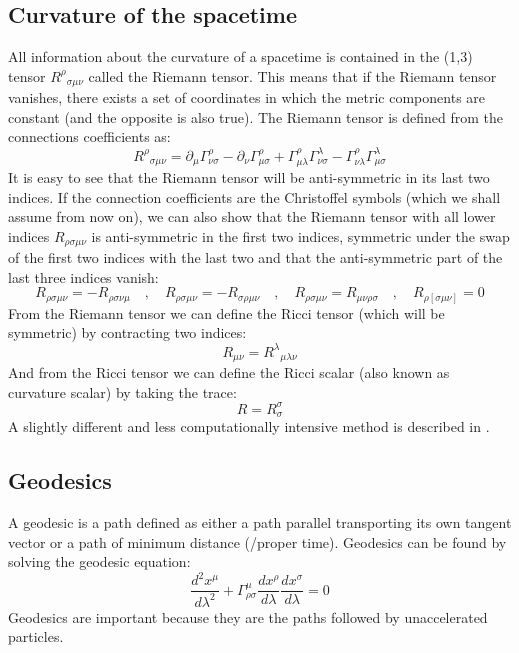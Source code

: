 \subsection{Curvature of the spacetime}
\thispagestyle{empty}
All information about the curvature of a spacetime is contained in the (1,3) tensor ${R^\rho}_{\sigma \mu \nu}$ called the Riemann tensor. This means that if the Riemann tensor vanishes, there exists a set of coordinates in which the metric components are constant (and the opposite is also true). The Riemann tensor is defined from the connections coefficients as:
\begin{equation}
{R^\rho}_{\sigma \mu \nu} = \partial_\mu \Gamma^\rho_{\nu \sigma} - \partial_\nu \Gamma^\rho_{\mu \sigma} +
\Gamma^\rho_{\mu \lambda} \Gamma^\lambda_{\nu \sigma} -
\Gamma^\rho_{\nu \lambda} \Gamma^\lambda_{\mu \sigma} 
\end{equation}
It is easy to see that the Riemann tensor will be anti-symmetric in its last two indices. If the connection coefficients are the Christoffel symbols (which we shall assume from now on), we can also show that the Riemann tensor with all lower indices $R_{\rho \sigma \mu \nu}$ is anti-symmetric in the first two indices, symmetric under the swap of the first two indices with the last two and that the anti-symmetric part of the last three indices vanish:
%
\begin{equation}
R_{\rho \sigma \mu \nu} = -R_{\rho \sigma \nu \mu} \quad, \quad
R_{\rho \sigma \mu \nu} = -R_{\sigma \rho \mu \nu} \quad, \quad
R_{\rho \sigma \mu \nu} = R_{\mu \nu \rho \sigma} \quad, \quad
R_{\rho [\sigma \mu \nu]} = 0
\end{equation}
%
From the Riemann tensor we can define the Ricci tensor (which will be symmetric) by contracting two indices:
\begin{equation}
R_{\mu \nu} = {R^\lambda}_{\mu \lambda \nu}
\end{equation}
And from the Ricci tensor we can define the Ricci scalar (also known as curvature scalar) by taking the trace:
\begin{equation}
R = R^\sigma_\sigma
\end{equation}
A slightly different and less computationally intensive method is described in \cite{Wald}.


\subsection{Geodesics}
\thispagestyle{empty}
A geodesic is a path defined as either a path parallel transporting its own tangent vector or a path of minimum distance (/proper time). Geodesics can be found by solving the geodesic equation:
%
\begin{equation}
\frac{d^2 x^\mu}{d\lambda^2} + \Gamma^\mu_{\rho \sigma}
\frac{dx^\rho}{d \lambda} \frac{dx^\sigma}{d\lambda} = 0
\end{equation}
%
Geodesics are important because they are the paths followed by unaccelerated particles.
%

